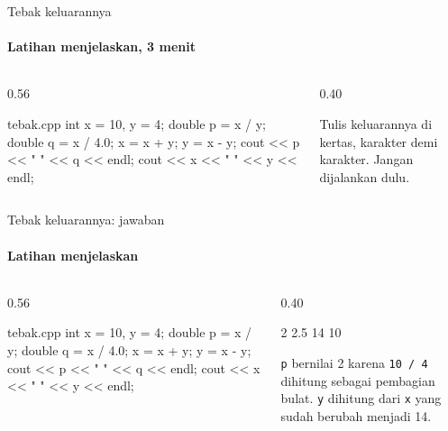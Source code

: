 \documentclass[t]{beamer}
\begin{document}
\begin{frame}[fragile]{Tebak keluarannya}
\framesubtitle{Latihan menjelaskan, 3 menit}
\begin{columns}[T]
\begin{column}{0.56\textwidth}
\begin{Kode}[]{tebak.cpp}
int x = 10, y = 4;
double p = x / y;
double q = x / 4.0;
x = x + y;
y = x - y;
cout << p << " " << q << endl;
cout << x << " " << y << endl;
\end{Kode}
\end{column}
\begin{column}{0.40\textwidth}
\begin{Catatan}
Tulis keluarannya di kertas, karakter demi karakter. Jangan dijalankan dulu.
\end{Catatan}
\end{column}
\end{columns}
\end{frame}

\begin{frame}[fragile]{Tebak keluarannya: jawaban}
\framesubtitle{Latihan menjelaskan}
\begin{columns}[T]
\begin{column}{0.56\textwidth}
\begin{Kode}[]{tebak.cpp}
int x = 10, y = 4;
double p = x / y;
double q = x / 4.0;
x = x + y;
y = x - y;
cout << p << " " << q << endl;
cout << x << " " << y << endl;
\end{Kode}
\end{column}
\begin{column}{0.40\textwidth}
\begin{Keluaran}[]
2 2.5
14 10
\end{Keluaran}
\begin{Catatan}
\texttt{p} bernilai 2 karena \texttt{10 / 4} dihitung sebagai pembagian bulat. \texttt{y} dihitung dari \texttt{x} yang sudah berubah menjadi 14.
\end{Catatan}
\end{column}
\end{columns}
\end{frame}
\end{document}
